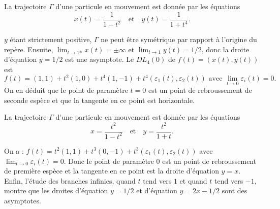 \begin{question}
La trajectoire $\Gamma$ d'une particule en mouvement est donnée par les équations
$$x(t)=\frac{1}{1-t^2}\quad \mbox{et}\quad y(t)=\frac{1}{1+t^4}.$$
\begin{answers}  
\end{answers}
\begin{explanations}
$y$ étant strictement positive, $\Gamma$ ne peut être symétrique par rapport à l'origine du repère. Ensuite, $\displaystyle \lim_{t\to 1^{\pm}}x(t)=\pm \infty$ et $\displaystyle \lim_{t\to 1}y(t)=1/2$, donc la droite d'équation $y=1/2$ est une asymptote. Le $DL_4(0)$ de $f(t)=(x(t),y(t))$ est 
$$f(t)=(1,1)+t^2(1,0)+t^4(1,-1)+t^4\left(\varepsilon_1(t),\varepsilon_2(t)\right)\mbox{ avec }\lim _{t\to 0}\varepsilon_i(t)=0.$$
On en déduit que le point de paramètre $t=0$ est un point de rebroussement de seconde espèce et que la tangente en ce point est horizontale.
\end{explanations}
\end{question}

\begin{question}
La trajectoire $\Gamma$ d'une particule en mouvement est donnée par les équations
$$x=\frac{t^2}{1-t^2}\quad \mbox{et} \quad  y=\frac{t^2}{1+t}.$$
\begin{answers}  
\end{answers}
\begin{explanations}
On a : $f(t)=t^2(1,1)+t^3(0,-1)+t^3\left(\varepsilon_1(t),\varepsilon_2(t)\right)$ avec $\displaystyle \lim _{t\to 0}\varepsilon_i(t)=0$. Donc le point de paramètre $0$ est un point de rebroussement de première espèce et la tangente en ce point est la droite d'équation $y=x$. Enfin, l'étude des branches infinies, quand $t$ tend vers $1$ et quand $t$ tend vers $-1$, montre que les droites d'équation $y=1/2$ et d'équation $y=2x-1/2$ sont des asymptotes.
\end{explanations}
\end{question}

